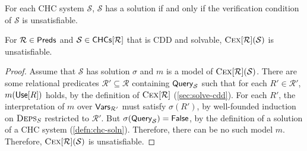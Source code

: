 For each CHC system $\mathcal{S}$, $\mathcal{S}$ has a solution if and
only if the verification condition of $\mathcal{S}$ is unsatisfiable.
%
\begin{lem}
  \label{lem:vc}
  For $\mathcal{R} \in \mathsf{Preds}$ and $\mathcal{S} \in \mathsf{CHCs}[ 
    \mathcal{R}  ]$ that is CDD and solvable, $\textsc{Cex}[{ \mathcal{R} }](
  \mathcal{S} )$ is unsatisfiable.
\end{lem}
%
\begin{proof}
  Assume that $\mathcal{S}$ has solution $\sigma$ and $m$ is a model
  of $\textsc{Cex}[{ \mathcal{R} }]( \mathcal{S})$.
  There are some relational predicates $\mathcal{R}' \subseteq
  \mathcal{R}$ containing $\mathsf{Query}_{ \mathcal{S} }$ such that for each
  $R' \in \mathcal{R}'$, $m(\mathsf{Use}[ R ])$ holds, by the definition of
  $\textsc{Cex}[{ \mathcal{R} }]$ (\autoref{sec:solve-cdd}).
  For each $R'$, the interpretation of $m$ over $\mathsf{Vars}_{ \mathcal{R}'
  }$ must satisfy $\sigma(R')$, by well-founded induction on $\textsc{Deps}_S$
  restricted to $\mathcal{R}'$.
  But $\sigma(\mathsf{Query}_{ \mathcal{S} }) = \mathsf{False}$, by the definition of
  a solution of a CHC system (\autoref{defn:chc-soln}).
  Therefore, there can be no such model $m$.
  Therefore, $\textsc{Cex}[{ \mathcal{R} }]( \mathcal{S} )$ is unsatisfiable.
\end{proof}

